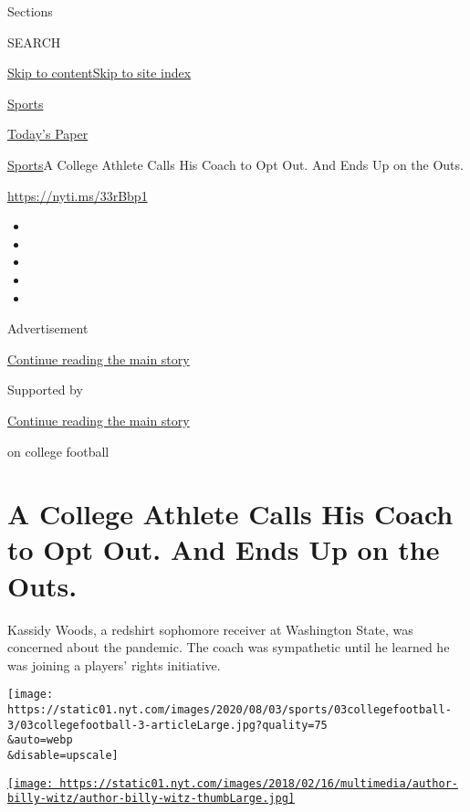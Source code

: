 Sections

SEARCH

\protect\hyperlink{site-content}{Skip to
content}\protect\hyperlink{site-index}{Skip to site index}

\href{https://www.nytimes.com/section/sports}{Sports}

\href{https://myaccount.nytimes.com/auth/login?response_type=cookie\&client_id=vi}{}

\href{https://www.nytimes.com/section/todayspaper}{Today's Paper}

\href{/section/sports}{Sports}\textbar{}A College Athlete Calls His
Coach to Opt Out. And Ends Up on the Outs.

\url{https://nyti.ms/33rBbp1}

\begin{itemize}
\item
\item
\item
\item
\item
\end{itemize}

Advertisement

\protect\hyperlink{after-top}{Continue reading the main story}

Supported by

\protect\hyperlink{after-sponsor}{Continue reading the main story}

on college football

\hypertarget{a-college-athlete-calls-his-coach-to-opt-out-and-ends-up-on-the-outs}{%
\section{A College Athlete Calls His Coach to Opt Out. And Ends Up on
the
Outs.}\label{a-college-athlete-calls-his-coach-to-opt-out-and-ends-up-on-the-outs}}

Kassidy Woods, a redshirt sophomore receiver at Washington State, was
concerned about the pandemic. The coach was sympathetic until he learned
he was joining a players' rights initiative.

\texttt{[image: https://static01.nyt.com/images/2020/08/03/sports/03collegefootball-3/03collegefootball-3-articleLarge.jpg?quality=75\\\&auto=webp\\\&disable=upscale]}

\href{https://www.nytimes.com/by/billy-witz}{\texttt{[image: https://static01.nyt.com/images/2018/02/16/multimedia/author-billy-witz/author-billy-witz-thumbLarge.jpg]}}

